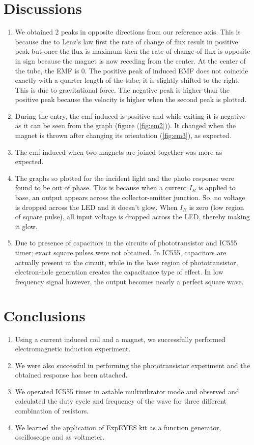 \documentclass[%
 aip,
 amsmath,amssymb,
 reprint, floatfix%
]{revtex4-1}
\begin{document}
\section{Discussions}
    \begin{enumerate}
        \item We obtained 2 peaks in opposite directions from our reference axis. This is because due to Lenz's law first the rate of change of flux result in positive peak but once the flux is maximum then the rate of change of flux is opposite in sign because the magnet is now receding from the center. At the center of the tube, the EMF is 0. The positive peak of induced EMF does not coincide exactly with a quarter length of the tube; it is slightly shifted to the right. This is due to gravitational force. The negative peak is higher than the positive peak because the velocity is higher when the second peak is plotted.
        \item During the entry, the emf induced is positive and while exiting it is negative as it can be seen from the graph (figure (\ref{fig:em2})). It changed when the magnet is thrown after changing its orientation (\ref{fig:em3}), as expected.
        \item The emf induced when two magnets are joined together was more as expected.
        \item The graphs so plotted for the incident light and the photo response were found to be out of phase. This is because when a current $I_B$ is applied to base, an output appears across the collector-emitter junction. So, no voltage is dropped across the LED and it doesn’t glow. When $I_B$ is zero (low region of square pulse), all input voltage is dropped across the LED, thereby making it glow.
        \item Due to presence of capacitors in the circuits of phototransistor and IC555 timer; exact square pulses were not obtained. In IC555, capacitors are actually present in the circuit, while in the base region of phototransistor, electron-hole generation creates the capacitance type of effect. In low frequency signal however, the output becomes nearly a perfect square wave.
    \end{enumerate}

\section{Conclusions}
    \begin{enumerate}
        \item Using a current induced coil and a magnet, we successfully performed electromagnetic induction experiment.
        \item We were also successful in performing the phototransistor experiment and the obtained response has been attached.
        \item We operated IC555 timer in astable multivibrator mode and observed and calculated the duty cycle and frequency of the wave for three different combination of resistors.
        \item We learned the application of ExpEYES kit as a function generator, oscilloscope and as voltmeter.
    \end{enumerate}
    
\end{document}
